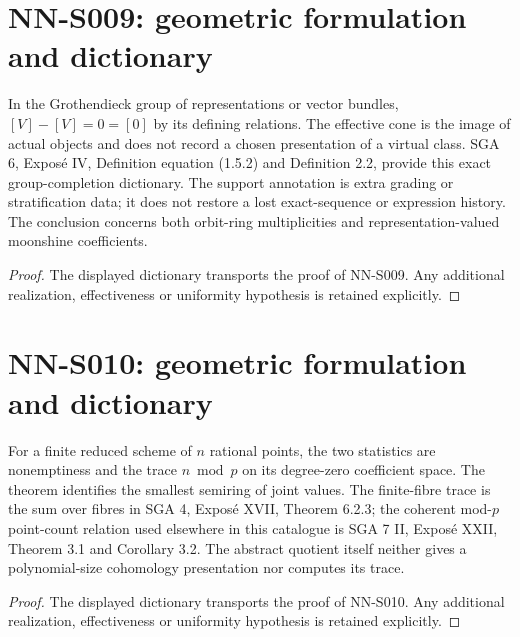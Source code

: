 \section{NN-S009: geometric formulation and dictionary}
\begin{geometricstatement}[NN-S009]
In the Grothendieck group of representations or vector bundles,
$[V]-[V]=0=[0]$ by its defining relations. The effective cone is
the image of actual objects and does not record a chosen
presentation of a virtual class. SGA 6, Expos\'e IV, Definition
equation (1.5.2) and Definition 2.2, provide this exact group-completion
dictionary. The support annotation is extra grading or
stratification data; it does not restore a lost exact-sequence
or expression history. The conclusion concerns both orbit-ring
multiplicities and representation-valued moonshine coefficients.
\end{geometricstatement}
\begin{proof} The displayed dictionary transports the proof of NN-S009. Any additional realization, effectiveness or uniformity hypothesis is retained explicitly.\end{proof}


\section{NN-S010: geometric formulation and dictionary}
\begin{geometricstatement}[NN-S010]
For a finite reduced scheme of $n$ rational points, the two
statistics are nonemptiness and the trace $n\bmod p$ on its
degree-zero coefficient space. The theorem identifies the
smallest semiring of joint values. The finite-fibre trace is
the sum over fibres in SGA 4, Expos\'e XVII, Theorem 6.2.3;
the coherent mod-$p$ point-count relation used elsewhere in
this catalogue is SGA 7 II, Expos\'e XXII, Theorem 3.1 and
Corollary 3.2. The abstract quotient itself neither gives a
polynomial-size cohomology presentation nor computes its trace.
\end{geometricstatement}
\begin{proof} The displayed dictionary transports the proof of NN-S010. Any additional realization, effectiveness or uniformity hypothesis is retained explicitly.\end{proof}


